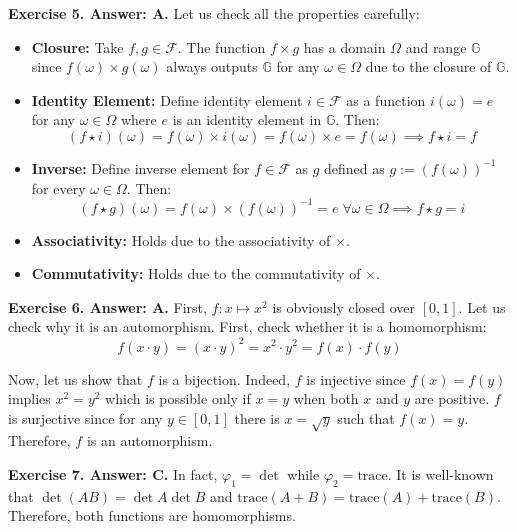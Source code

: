\documentclass[../lecture-notes-148x210.tex]{subfiles}
\begin{document}
\textbf{Exercise 5. Answer: A.} Let us check all the properties carefully:
\begin{itemize}
    \item \textbf{Closure:} Take $f,g \in \mathcal{F}$. The function $f \times
    g$ has a domain $\Omega$ and range $\mathbb{G}$ since $f(\omega)\times
    g(\omega)$ always outputs $\mathbb{G}$ for any $\omega \in \Omega$ due to
    the closure of $\mathbb{G}$.
    \item \textbf{Identity Element:} Define identity element $i \in \mathcal{F}$
    as a function $i(\omega) = e$ for any $\omega \in \Omega$ where $e$ is an
    identity element in $\mathbb{G}$. Then:
    \begin{equation*}
        (f \star i)(\omega) = f(\omega) \times i(\omega) = f(\omega) \times e = f(\omega) \implies f \star i = f
    \end{equation*}
    \item \textbf{Inverse:} Define inverse element for $f \in \mathcal{F}$ as 
    $g$ defined as $g := (f(\omega))^{-1}$ for every $\omega \in \Omega$. Then:
    \begin{equation*}
        (f \star g)(\omega) = f(\omega) \times (f(\omega))^{-1} = e \; \forall \omega \in \Omega \implies f \star g = i
    \end{equation*}
    \item \textbf{Associativity:} Holds due to the associativity of $\times$.
    \item \textbf{Commutativity:} Holds due to the commutativity of $\times$.
\end{itemize}

\textbf{Exercise 6. Answer: A.} First, $f: x \mapsto x^2$ is obviously closed over
$[0,1]$. Let us check why it is an automorphism. First, check whether it is a homomorphism:
\begin{equation*}
    f(x \cdot y) = (x \cdot y)^2 = x^2 \cdot y^2 = f(x) \cdot f(y)
\end{equation*}

Now, let us show that $f$ is a bijection. Indeed, $f$ is injective since
$f(x)=f(y)$ implies $x^2=y^2$ which is possible only if $x=y$ when both $x$ and
$y$ are positive. $f$ is surjective since for any $y \in [0,1]$ there is 
$x=\sqrt{y}$ such that $f(x)=y$. Therefore, $f$ is an automorphism.

\textbf{Exercise 7. Answer: C.} In fact, $\varphi_1=\det$ while
$\varphi_2=\text{trace}$. It is well-known that $\det(AB)=\det A \det B$ and
$\text{trace}(A+B)=\text{trace}(A)+\text{trace}(B)$. Therefore, both 
functions are homomorphisms.
\end{document}
